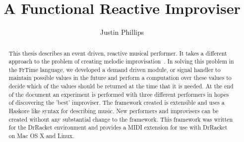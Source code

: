\documentclass[12pt]{ucthesis}
\begin{document}

\title{A Functional Reactive Improviser}
\author{Justin Phillips}
  
 
     



\maketitle

\begin{frontmatter}

\copyrightpage

\committeemembershippage

\begin{abstract}

This thesis describes an event driven, reactive musical performer. It takes a different approach to the problem of creating melodic improvisation~\cite{bob}. In solving this problem in the FrTime language, we developed a demand driven module, or signal handler to maintain possible values in the future and perform a computation over these values to decide which of the values should be  returned at the time that it is needed. At the end of the document an experiment is performed with three different performers in hopes of discovering the 'best' improviser. The framework created is extensible and uses a Haskore like syntax for describing music. New performers and improvisers can be created without any substantial change to the framework. This framework was written for the DrRacket environment and provides a MIDI extension for use with DrRacket on Mac OS X and Linux. 

\end{abstract}





\tableofcontents


\listoftables

\listoffigures

\end{frontmatter}
\end{document}
